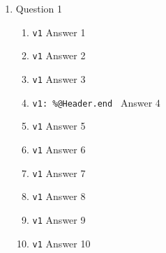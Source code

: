 \documentclass{article}%
\begin{document}
\begin{enumerate}
\begin{enumerate}
\item \verb+v1+ Answer 1
\item \verb+v1+ Answer 2
\item \verb+v1+ Answer 3
\item \verb+v1: %@Header.end + Answer 4 %
\item \verb+v1+ Answer 5
\item \verb+v1+ Answer 6
\item \verb+v1+ Answer 7
\item \verb+v1+ Answer 8		%
\item \verb+v1+ Answer 9
\item \verb+v1+ Answer 10	
\end{enumerate}
Let it be the code:
\begin{lstlisting}
	\begin{theorem}
	(The Currant minimax principle.) Let $T$ be completely continuous selfadjoint operator
	in a Hilbert space $H$. Let $n$ be an arbitrary integer and let $u_1,\ldots,u_{n-1}$ be
	an arbitrary system of $n-1$ linearly independent elements of $H$. Denote
	\begin{equation}
	\max_{\substack{v\in H, v\neq
	0\\(v,u_1)=0,\ldots,(v,u_n)=0}}\frac{(Tv,v)}{(v,v)}=m(u_1,\ldots, u_{n-1})
	\label{eqn10}
	\end{equation}
	Then the $n$-th eigenvalue of $T$ is equal to the minimum of these maxima, when
	minimizing over all linearly independent systems $u_1,\ldots u_{n-1}$ in $H$,
	\begin{equation}
	\mu_n = \min_{\substack{u_1,\ldots, u_{n-1}\in H}} m(u_1,\ldots, u_{n-1}) \label{eqn20}
	\end{equation}
	\end{theorem}
	The above equations are automatically numbered as equation (\ref{eqn10}) and
	(\ref{eqn20}).

\end{lstlisting}
\item Question 1\\
\begin{enumerate}
	\item \verb+v1+ Answer 1
	\item \verb+v1+ Answer 2
	\item \verb+v1+ Answer 3
	\item \verb+v1: %@Header.end + Answer 4 %
	\item \verb+v1+ Answer 5
	\item \verb+v1+ Answer 6
	\item \verb+v1+ Answer 7
	\item \verb+v1+ Answer 8		%
	\item \verb+v1+ Answer 9
	\item \verb+v1+ Answer 10	
\end{enumerate}


\end{enumerate}
\end{document}
